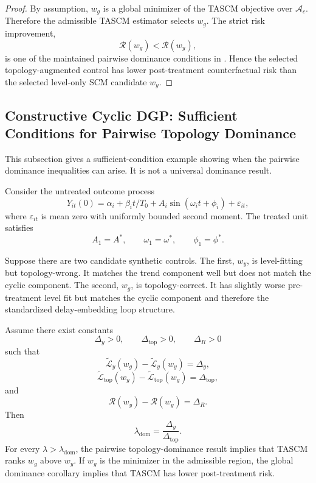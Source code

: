 \documentclass[11pt]{article}
\theoremstyle{plain}
\theoremstyle{definition}
\theoremstyle{remark}
\newcommand{\1}{\mathbbm{1}}
\begin{document}
\begin{proof}
By assumption, \(w_g\) is a global minimizer of the TASCM objective over
\(\mathcal A_c\). Therefore the admissible TASCM estimator selects \(w_g\).
The strict risk improvement,
\[
\mathcal R(w_g)<\mathcal R(w_y),
\]
is one of the maintained pairwise dominance conditions in
. Hence the selected topology-augmented control
has lower post-treatment counterfactual risk than the selected level-only SCM
candidate \(w_y\).
\end{proof}

\subsection{Constructive Cyclic DGP: Sufficient Conditions for Pairwise Topology Dominance}

This subsection gives a sufficient-condition example showing when the pairwise
dominance inequalities can arise. It is not a universal dominance result.

Consider the untreated outcome process
\[
Y_{it}(0)
=
\alpha_i+\beta_i t/T_0
+
A_i\sin(\omega_i t+\phi_i)
+
\varepsilon_{it},
\]
where \(\varepsilon_{it}\) is mean zero with uniformly bounded second moment.
The treated unit satisfies
\[
A_1=A^*,
\qquad
\omega_1=\omega^*,
\qquad
\phi_1=\phi^*.
\]

Suppose there are two candidate synthetic controls. The first, \(w_y\), is
level-fitting but topology-wrong. It matches the trend component well but does
not match the cyclic component. The second, \(w_g\), is topology-correct. It has
slightly worse pre-treatment level fit but matches the cyclic component and
therefore the standardized delay-embedding loop structure.

Assume there exist constants
\[
\Delta_y>0,\qquad
\Delta_{\mathrm{top}}>0,\qquad
\Delta_R>0
\]
such that
\[
\widetilde{\mathcal L}_y(w_g)
-
\widetilde{\mathcal L}_y(w_y)
=
\Delta_y,
\]
\[
\widetilde{\mathcal L}_{\mathrm{top}}(w_y)
-
\widetilde{\mathcal L}_{\mathrm{top}}(w_g)
=
\Delta_{\mathrm{top}},
\]
and
\[
\mathcal R(w_y)-\mathcal R(w_g)
=
\Delta_R.
\]
Then
\[
\lambda_{\mathrm{dom}}
=
\frac{\Delta_y}{\Delta_{\mathrm{top}}}.
\]
For every \(\lambda>\lambda_{\mathrm{dom}}\), the pairwise topology-dominance
result implies that TASCM ranks \(w_g\) above \(w_y\). If \(w_g\) is the
minimizer in the admissible region, the global dominance corollary implies that
TASCM has lower post-treatment risk.
\end{document}
